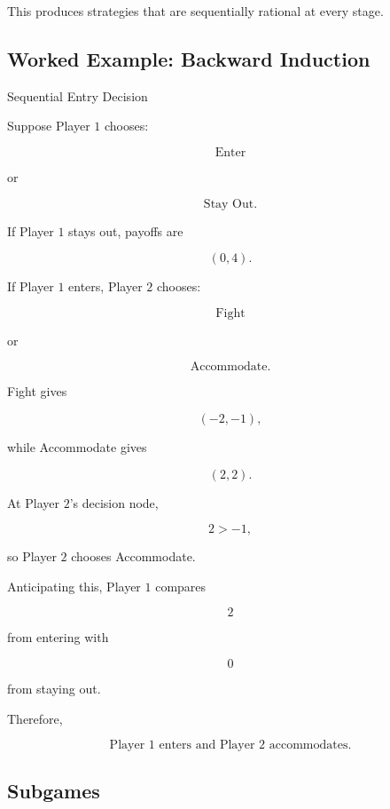 This produces strategies that are sequentially rational at every stage.

\subsection{Worked Example: Backward Induction}
\label{subsec:worked-backward-induction-game}

\begin{workedexamplebox}{Sequential Entry Decision}

Suppose Player \(1\) chooses:

\[
\text{Enter}
\]

or

\[
\text{Stay Out}.
\]

If Player \(1\) stays out, payoffs are

\[
(0,4).
\]

If Player \(1\) enters, Player \(2\) chooses:

\[
\text{Fight}
\]

or

\[
\text{Accommodate}.
\]

Fight gives

\[
(-2,-1),
\]

while Accommodate gives

\[
(2,2).
\]

At Player \(2\)'s decision node,

\[
2>-1,
\]

so Player \(2\) chooses Accommodate.

Anticipating this, Player \(1\) compares

\[
2
\]

from entering with

\[
0
\]

from staying out.

Therefore,

\begin{answerbox}
\[
\boxed{
\text{Player 1 enters and Player 2 accommodates}.
}
\]
\end{answerbox}

\end{workedexamplebox}

\subsection{Subgames}
\label{subsec:subgames}

